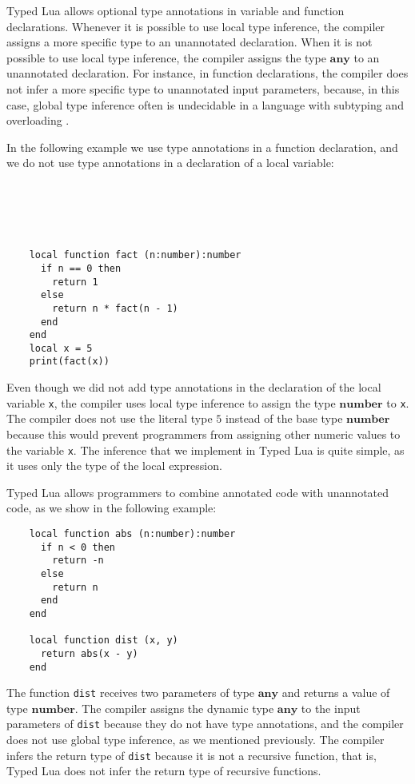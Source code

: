 \documentclass[preprint]{sig-alternate}
\newcommand{\Any}{\mathbf{any}}
\newcommand{\Number}{\mathbf{number}}
\begin{document}
Typed Lua allows optional type annotations in variable and function
declarations.
Whenever it is possible to use local type inference, the compiler
assigns a more specific type to an unannotated declaration.
When it is not possible to use local type inference, the compiler
assigns the type $\Any$ to an unannotated declaration.
For instance, in function declarations, the compiler does not infer
a more specific type to unannotated input parameters, because,
in this case, global type inference often is undecidable in a
language with subtyping and overloading \citep{wells1999typability}.

In the following example we use type annotations in a function
declaration, and we do not use type annotations in a declaration of a
local variable:
\begin{verbatim}





    local function fact (n:number):number
      if n == 0 then
        return 1
      else
        return n * fact(n - 1)
      end
    end
    local x = 5
    print(fact(x))
\end{verbatim}

Even though we did not add type annotations in the declaration of
the local variable \texttt{x}, the compiler uses local type inference to
assign the type $\Number$ to \texttt{x}.
The compiler does not use the literal type $5$ instead of the base
type $\Number$ because this would prevent
programmers from assigning other numeric values to the variable
\texttt{x}.
The inference that we implement in Typed Lua is quite simple, as it
uses only the type of the local expression.

Typed Lua allows programmers to combine annotated code with
unannotated code, as we show in the following example:
\begin{verbatim}
    local function abs (n:number):number
      if n < 0 then
        return -n
      else
        return n
      end
    end

    local function dist (x, y)
      return abs(x - y)
    end
\end{verbatim}

The function \texttt{dist} receives two parameters of type $\Any$
and returns a value of type $\Number$.
The compiler assigns the dynamic type $\Any$ to the input
parameters of \texttt{dist} because they do not have type annotations,
and the compiler does not use global type inference, as we mentioned
previously.
The compiler infers the return type of \texttt{dist} because it is
not a recursive function, that is, Typed Lua does not infer the return
type of recursive functions.
\end{document}
